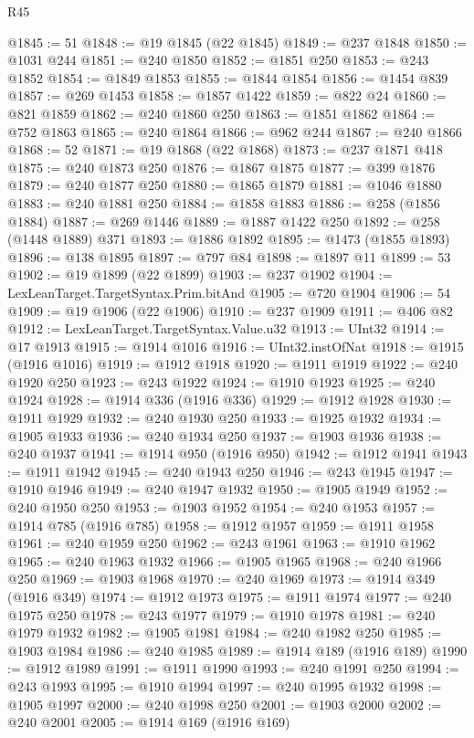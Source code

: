\begin{lexlean}{R45}
\begin{coremodule}
{@1845 := 51
@1848 := @19 @1845 (@22 @1845)
@1849 := @237 @1848
@1850 := @1031 @244
@1851 := @240 @1850
@1852 := @1851 @250
@1853 := @243 @1852
@1854 := @1849 @1853
@1855 := @1844 @1854
@1856 := @1454 @839
@1857 := @269 @1453
@1858 := @1857 @1422
@1859 := @822 @24
@1860 := @821 @1859
@1862 := @240 @1860 @250
@1863 := @1851 @1862
@1864 := @752 @1863
@1865 := @240 @1864
@1866 := @962 @244
@1867 := @240 @1866
@1868 := 52
@1871 := @19 @1868 (@22 @1868)
@1873 := @237 @1871 @418
@1875 := @240 @1873 @250
@1876 := @1867 @1875
@1877 := @399 @1876
@1879 := @240 @1877 @250
@1880 := @1865 @1879
@1881 := @1046 @1880
@1883 := @240 @1881 @250
@1884 := @1858 @1883
@1886 := @258 (@1856 @1884)
@1887 := @269 @1446
@1889 := @1887 @1422 @250
@1892 := @258 (@1448 @1889) @371
@1893 := @1886 @1892
@1895 := @1473 (@1855 @1893)
@1896 := @138 @1895
@1897 := @797 @84
@1898 := @1897 @11
@1899 := 53
@1902 := @19 @1899 (@22 @1899)
@1903 := @237 @1902
@1904 := LexLeanTarget.TargetSyntax.Prim.bitAnd
@1905 := @720 @1904
@1906 := 54
@1909 := @19 @1906 (@22 @1906)
@1910 := @237 @1909
@1911 := @406 @82
@1912 := LexLeanTarget.TargetSyntax.Value.u32
@1913 := UInt32
@1914 := @17 @1913
@1915 := @1914 @1016
@1916 := UInt32.instOfNat
@1918 := @1915 (@1916 @1016)
@1919 := @1912 @1918
@1920 := @1911 @1919
@1922 := @240 @1920 @250
@1923 := @243 @1922
@1924 := @1910 @1923
@1925 := @240 @1924
@1928 := @1914 @336 (@1916 @336)
@1929 := @1912 @1928
@1930 := @1911 @1929
@1932 := @240 @1930 @250
@1933 := @1925 @1932
@1934 := @1905 @1933
@1936 := @240 @1934 @250
@1937 := @1903 @1936
@1938 := @240 @1937
@1941 := @1914 @950 (@1916 @950)
@1942 := @1912 @1941
@1943 := @1911 @1942
@1945 := @240 @1943 @250
@1946 := @243 @1945
@1947 := @1910 @1946
@1949 := @240 @1947 @1932
@1950 := @1905 @1949
@1952 := @240 @1950 @250
@1953 := @1903 @1952
@1954 := @240 @1953
@1957 := @1914 @785 (@1916 @785)
@1958 := @1912 @1957
@1959 := @1911 @1958
@1961 := @240 @1959 @250
@1962 := @243 @1961
@1963 := @1910 @1962
@1965 := @240 @1963 @1932
@1966 := @1905 @1965
@1968 := @240 @1966 @250
@1969 := @1903 @1968
@1970 := @240 @1969
@1973 := @1914 @349 (@1916 @349)
@1974 := @1912 @1973
@1975 := @1911 @1974
@1977 := @240 @1975 @250
@1978 := @243 @1977
@1979 := @1910 @1978
@1981 := @240 @1979 @1932
@1982 := @1905 @1981
@1984 := @240 @1982 @250
@1985 := @1903 @1984
@1986 := @240 @1985
@1989 := @1914 @189 (@1916 @189)
@1990 := @1912 @1989
@1991 := @1911 @1990
@1993 := @240 @1991 @250
@1994 := @243 @1993
@1995 := @1910 @1994
@1997 := @240 @1995 @1932
@1998 := @1905 @1997
@2000 := @240 @1998 @250
@2001 := @1903 @2000
@2002 := @240 @2001
@2005 := @1914 @169 (@1916 @169)
}
\end{coremodule}
\end{lexlean}
